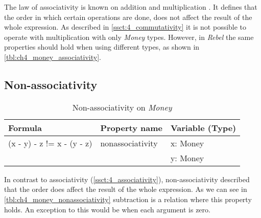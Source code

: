 The law of associativity is known on addition and multiplication \cite{baumgart1961axioms}. It defines that the order in which certain operations are done, does not affect the result of the whole expression. As described in \autoref{ssct:4_commutativity} it is not possible to operate with multiplication with only \textit{Money} types. However, in \textit{Rebel} the same properties should hold when using different types, as shown in \autoref{tbl:ch4_money_associativity}.

\subsection*{Non-associativity}
\begin{table}[h!]
\centering
\begin{tabular}{|lll|}
\hline
                        \textbf{Formula}           & \textbf{Property name} & \textbf{Variable (Type)} \\ \hline
\rowcolor[HTML]{EFEFEF} (x - y) - z != x - (y - z) & nonassociativity       & x: Money                 \\
\rowcolor[HTML]{EFEFEF}                            &                        & y: Money                 \\ \hline
\end{tabular}
\caption{Non-associativity on \textit{Money}}
\label{tbl:ch4_money_nonassociativity}
\end{table}
In contrast to associativity (\autoref{ssct:4_associativity}), non-associativity described that the order does affect the result of the whole expression. As we can see in \autoref{tbl:ch4_money_nonassociativity} subtraction is a relation where this property holds. An exception to this would be when each argument is zero.

